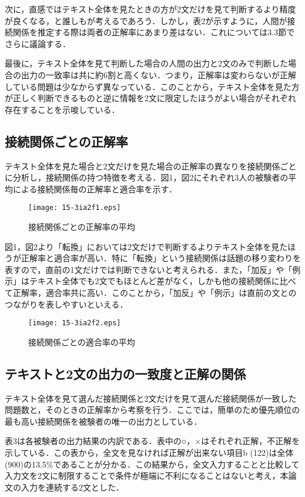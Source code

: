 \documentclass[japanese]{jnlp_1.4}
\begin{document}
次に，直感ではテキスト全体を見たときの方が2文だけを見て判断するより精度が良くなる，と誰しもが考えるであろう．しかし，表2が示すように，人間が接続関係を推定する際は両者の正解率にあまり差はない．これについては3.3節でさらに議論する．

最後に，テキスト全体を見て判断した場合の人間の出力と2文のみで判断した場合の出力の一致率は共に約6割と高くない．つまり，正解率は変わらないが正解している問題は少なからず異なっている．このことから，テキスト全体を見た方が正しく判断できるものと逆に情報を2文に限定したほうがよい場合がそれぞれ存在することを示唆している．

\subsection{接続関係ごとの正解率}

テキスト全体を見た場合と2文だけを見た場合の正解率の異なりを接続関係ごとに分析し，接続関係の持つ特徴を考える．図1，図2にそれぞれ3人の被験者の平均による接続関係毎の正解率と適合率を示す．

\begin{figure}[b]
\centerline{\texttt{[image: 15-3ia2f1.eps]}}
\caption{接続関係ごとの正解率の平均}
\end{figure}

図1，図2より「転換」においては2文だけで判断するよりテキスト全体を見たほうが正解率と適合率が高い．特に「転換」という接続関係は話題の移り変わりを表すので，直前の1文だけでは判断できないと考えられる．また，「加反」や「例示」はテキスト全体でも2文でもほとんど差がなく，しかも他の接続関係に比べて正解率，適合率共に高い．このことから，「加反」や「例示」は直前の文とのつながりを表しやすいといえる．

\begin{figure}[t]
\centerline{\texttt{[image: 15-3ia2f2.eps]}}
\caption{接続関係ごとの適合率の平均}
\end{figure}


\subsection{テキストと2文の出力の一致度と正解の関係}

テキスト全体を見て選んだ接続関係と2文だけを見て選んだ接続関係が一致した問題数と，そのときの正解率から考察を行う．ここでは，簡単のため優先順位の最も高い接続関係を被験者の唯一の出力としている．

表3は各被験者の出力結果の内訳である．表中の○，×はそれぞれ正解，不正解を示している．この表から，全文を見なければ正解が出来ない項目b 
(122)は全体(900)の13.5{\%}であることが分かる．この結果から，全文入力することと比較して入力文を2文に制限することで条件が極端に不利になることはないと考え，本論文の入力を連続する2文とした．
\end{document}
